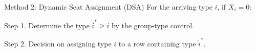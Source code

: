   
  

    
    \begin{frame}{Method 2: Dynamic Seat Assignment (DSA)}
      For the arriving type $i$, if $X_i =0$:

      \vspace{0.5cm}

      Step 1. Determine the type $\hat{i}^{*}> i$ by the group-type control.

      \vspace{0.5cm}

      Step 2. Decision on assigning type $i$ to a row containing type $\hat{i}^{*}$.

        


    \end{frame}

